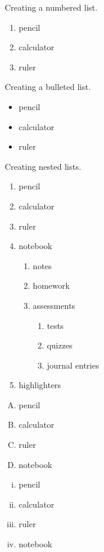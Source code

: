 \documentclass[11pt]{article}
\begin{document}
Creating a numbered list.\\
\begin{enumerate}
\item pencil
\item calculator
\item ruler\\
\end{enumerate}

Creating a bulleted list.\\
\begin{itemize}
\item pencil
\item calculator
\item ruler\\
\end{itemize}

Creating nested lists.\\
\begin{enumerate}
\item pencil
\item calculator
\item ruler
\item notebook
	\begin{enumerate}
	\item notes
	\item homework
	\item assessments
		\begin{enumerate}
		\item tests
		\item quizzes
		\item journal entries
		\end{enumerate}
	\end{enumerate}
\item highlighters
\end{enumerate}

\vspace{4 cm}

\begin{enumerate}[A.]
\item pencil
\item calculator
\item ruler
\item notebook
\end{enumerate}

\vspace{1 cm}

\begin{enumerate}[i.]
\item pencil
\item calculator
\item ruler
\item notebook
\end{enumerate}
\end{document}
